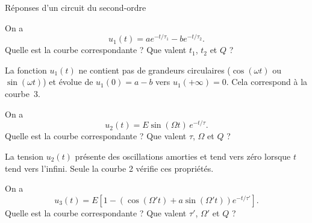\begin{exo}[PC][1][colle]{Réponses d'un circuit du second-ordre}
\begin{quest}
\item On a 
\[
u_1(t)=ae^{-t/\tau_1}-be^{-t/\tau_2}.
\]
 Quelle est la courbe correspondante ? Que valent $t_1$, $t_2$ et $Q$ ?
\begin{corrige}
La fonction $u_1(t)$ ne contient pas de grandeurs circulaires ($\cos(\omega t)$ ou $\sin(\omega t)$) et évolue de $u_1(0)=a-b$ vers $u_1(+\infty)=0$. Cela correspond à la courbe~3.
\end{corrige}



\item On a 
\[
u_2(t)=E\sin(\Omega t)\,e^{-t/\tau}.
\] Quelle est la courbe correspondante ? Que valent $\tau$, $\Omega$ et $Q$ ?
\begin{corrige}
La tension $u_2(t)$ présente des oscillations amorties et tend vers zéro lorsque $t$ tend vers l'infini. Seule la courbe 2 vérifie ces propriétés.
\end{corrige}




\item 
On a 
\[
u_3(t)=E\left[1 - \left(\cos(\Omega' t)+a\sin(\Omega't)\right)e^{-t/\tau'}\right].
\]
 Quelle est la courbe correspondante ? Que valent $\tau'$, $\Omega'$ et $Q$ ?


\end{quest}
\end{exo}
